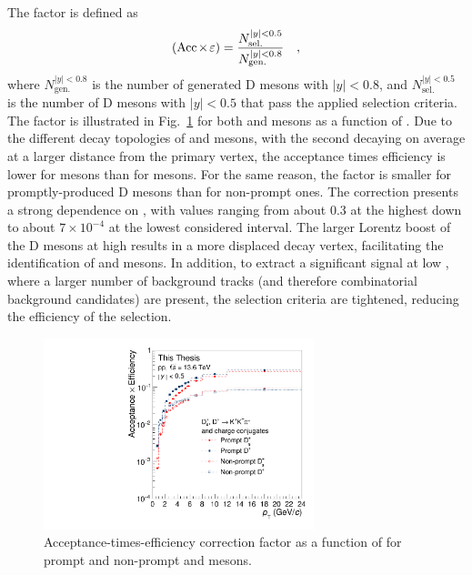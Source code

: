 The \aeff factor is defined as
\begin{equation*}
    (\mathrm{Acc}\mkern-2mu\times\mkern-2mu\varepsilon) = \frac{N_\mathrm{sel.}^{\lvert y\rvert<0.5}}{N_\mathrm{gen.}^{\lvert y\rvert<0.8}}\quad ,
\end{equation*}
where $N_\mathrm{gen.}^{\lvert y\rvert<0.8}$ is the number of generated D mesons with $\lvert y\rvert<0.8$, and $N_\mathrm{sel.}^{\lvert y\rvert<0.5}$ is the number of D mesons with $\lvert y\rvert<0.5$ that pass the applied selection criteria. The \aeff factor is illustrated in Fig.~\ref{fig:Aeff} for both \ds and \dpl mesons as a function of \pt. Due to the different decay topologies of \ds and \dpl mesons, with the second decaying on average at a larger distance from the primary vertex, the acceptance times efficiency is lower for \ds mesons than for \dpl mesons. For the same reason, the \aeff factor is smaller for promptly-produced D mesons than for non-prompt ones. The correction presents a strong dependence on \pt, with values ranging from about 0.3 at the highest \pt down to about $7\times 10^{-4}$ at the lowest considered \pt interval. The larger Lorentz boost of the D mesons at high \pt results in a more displaced decay vertex, facilitating the identification of \ds and \dpl mesons. In addition, to extract a significant signal at low \pt, where a larger number of background tracks (and therefore combinatorial background candidates) are present, the selection criteria are tightened, reducing the efficiency of the selection.


\begin{figure}[htb]
    \begin{center}
    \includegraphics[width=0.7\textwidth]{Figures/Chapter 6/Efficiency_LHC24d3a.pdf}
    \caption{Acceptance-times-efficiency correction factor as a function of \pt for prompt and non-prompt \ds and \dpl mesons.} 
    \label{fig:Aeff} 
    \end{center}
\end{figure}

